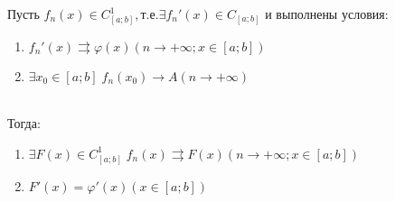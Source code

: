 \begin{Th}
	Пусть $f_n(x) \in C_{[a;b]}^{1}, \text{т.е.} \exists f_n'(x) \in C_{[a;b]}$ и выполнены условия:\\
	\begin{enumerate}
		\item $f_n'(x) \rightrightarrows \varphi (x) (n \to +\infty; x \in [a;b])$
		\item $\exists x_0 \in [a;b] \; f_n(x_0) \rightarrow A (n \to +\infty)$
	\end{enumerate}
	\\Тогда:\\
	\begin{enumerate}
		\item $\exists F(x) \in C_{[a;b]}^{1} \; f_n(x) \rightrightarrows F(x) (n \to +\infty; x \in [a;b])$
		\item $F'(x) = \varphi'(x) (x \in [a;b])$
	\end{enumerate}
\end{Th}

